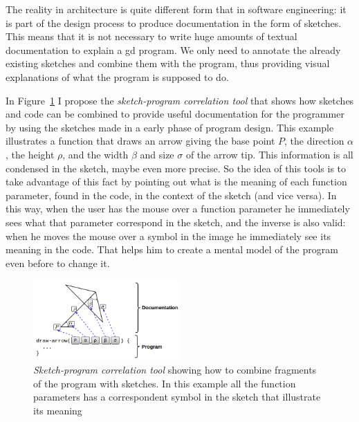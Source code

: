 The reality in architecture is quite different form that in software engineering: it is part of the design process to produce documentation in the form of sketches. This means that it is not necessary to write huge amounts of textual documentation to explain a \gls{gd} program. We only need to annotate the already existing sketches and combine them with the program, thus providing visual explanations of what the program is supposed to do.

In Figure~\ref{fig:sc-tool} I propose the \textit{sketch-program correlation tool} that shows how sketches and code can be combined to provide useful documentation for the programmer by using the sketches made in a early phase of program design. This example illustrates a function that draws an arrow giving the base point $P$, the direction $\alpha$, the height $\rho$, and the width $\beta$ and size $\sigma$ of the arrow tip. This information is all condensed in the sketch, maybe even more precise. So the idea of this tools is to take advantage of this fact by pointing out what is the meaning of each function parameter, found in the code, in the context of the sketch (and vice versa). In this way, when the user has the mouse over a function parameter he immediately sees what that parameter correspond in the sketch, and  the inverse is also valid: when he moves the mouse over a symbol in the image he immediately see its meaning in the code. That helps him to create a mental model of the program even before to change it.

\begin{figure}[!htbp]
  \centering
  \includegraphics[width=0.5\textwidth]{images/proposed-sc-tool}
    \caption{\textit{Sketch-program correlation tool} showing how to combine fragments of the program with sketches. In this example all the function parameters has a correspondent symbol in the sketch that illustrate its meaning}
  \label{fig:sc-tool}
\end{figure}

